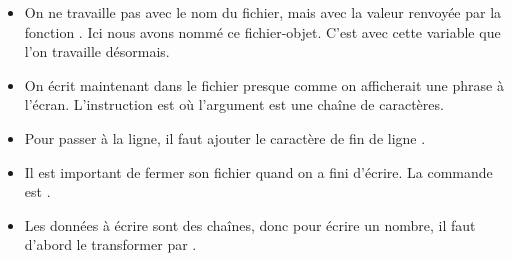 \documentclass[11pt,class=report,crop=false]{standalone}
\begin{document}
\begin{cours}
\begin{itemize}
  \item On ne travaille pas avec le nom du fichier, mais avec la valeur renvoyée par la fonction . Ici nous avons nommé  ce fichier-objet. C'est avec cette variable  que l'on travaille désormais.
  
  \item On écrit maintenant dans le fichier presque comme on afficherait une phrase à l'écran. L'instruction est  où l'argument est une chaîne de caractères.
  
  \item Pour passer à la ligne, il faut ajouter le caractère de fin de ligne .
  
  \item Il est important de fermer son fichier quand on a fini d'écrire. La commande est . 
   
  \item Les données à écrire sont des chaînes, donc pour écrire un nombre, il faut d'abord le transformer par .
\end{itemize}
  
  
\end{cours}
\end{document}
